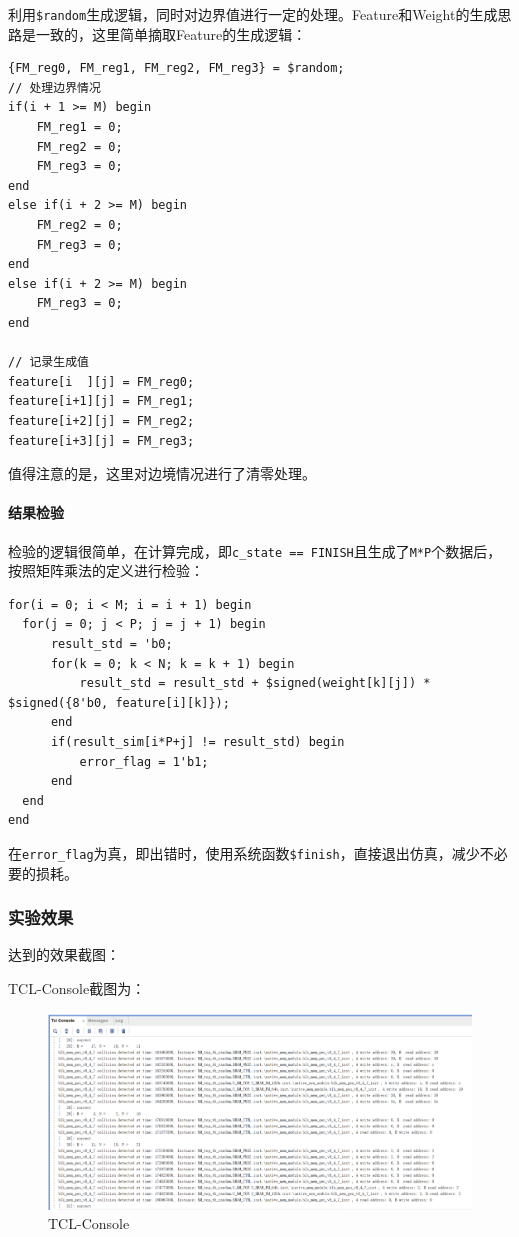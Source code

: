 \documentclass[12pt,a4paper]{article}
\begin{document}
利用\texttt{\$random}生成逻辑，同时对边界值进行一定的处理。Feature和Weight的生成思路是一致的，这里简单摘取Feature的生成逻辑：

\begin{lstlisting}  
{FM_reg0, FM_reg1, FM_reg2, FM_reg3} = $random;
// 处理边界情况
if(i + 1 >= M) begin
    FM_reg1 = 0;
    FM_reg2 = 0;
    FM_reg3 = 0;
end 
else if(i + 2 >= M) begin
    FM_reg2 = 0;
    FM_reg3 = 0;
end 
else if(i + 2 >= M) begin
    FM_reg3 = 0;
end

// 记录生成值
feature[i  ][j] = FM_reg0;
feature[i+1][j] = FM_reg1;
feature[i+2][j] = FM_reg2;
feature[i+3][j] = FM_reg3;
\end{lstlisting}

值得注意的是，这里对边境情况进行了清零处理。

\paragraph{结果检验}

检验的逻辑很简单，在计算完成，即\texttt{c\_state\ ==\ FINISH}且生成了\texttt{M*P}个数据后，按照矩阵乘法的定义进行检验：

\begin{lstlisting}
for(i = 0; i < M; i = i + 1) begin
  for(j = 0; j < P; j = j + 1) begin
      result_std = 'b0;
      for(k = 0; k < N; k = k + 1) begin
          result_std = result_std + $signed(weight[k][j]) * $signed({8'b0, feature[i][k]});
      end
      if(result_sim[i*P+j] != result_std) begin
          error_flag = 1'b1;
      end
  end
end
\end{lstlisting}

在\texttt{error\_flag}为真，即出错时，使用系统函数\texttt{\$finish}，直接退出仿真，减少不必要的损耗。

\subsubsection{实验效果}

达到的效果截图：

TCL-Console截图为：

\begin{figure}[htbp]
    \centering
    \includegraphics[width=\linewidth]{img/TCL.png}
    \caption{TCL-Console}
\end{figure}
\end{document}
